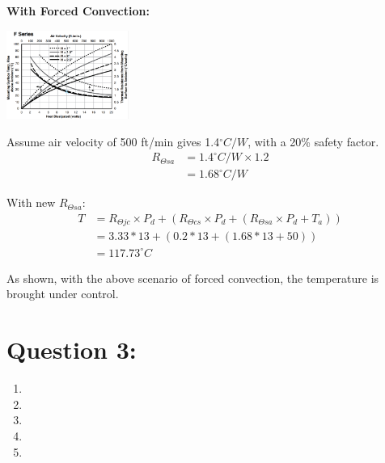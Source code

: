 \documentclass[11pt]{article}
\begin{document}
\begin{preview}
\begin{enumerate}[label=\alph*)]
          \textbf{With Forced Convection:}

          \begin{center}
            \includegraphics[width=0.3\textwidth]{F_series_heatsink_forces.png}
          \end{center}

          Assume air velocity of 500 ft/min gives 1.4$^{\circ}C/W$, with a 20\% safety factor. 
          \begin{align*}
          R_{\Theta sa} &= 1.4^{\circ}C/W \times 1.2 \\
          &=1.68^{\circ}C/W
          \end{align*}

          With new $R_{\Theta sa}$:
          \begin{align*}
            T &= R_{\Theta jc} \times P_{d} + (R_{\Theta cs} \times P_{d} + (R_{\Theta sa} \times P_{d} + T_{a})) \\
            &= 3.33*13+(0.2*13+(1.68*13+50)) \\
            &= 117.73^{\circ}C
          \end{align*}

          As shown, with the above scenario of forced convection, the temperature is brought under control.

\end{enumerate}

\section*{Question 3:}
\begin{enumerate}[label=\alph*)]
          \item
          \item
          \item
          \item
          \item
\end{enumerate}
\end{preview}
\end{document}
